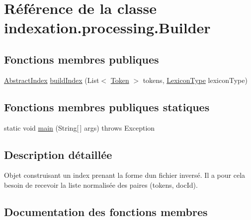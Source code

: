 \hypertarget{classindexation_1_1processing_1_1Builder}{}\section{Référence de la classe indexation.\+processing.\+Builder}
\label{classindexation_1_1processing_1_1Builder}
\subsection*{Fonctions membres publiques}
\begin{DoxyCompactItemize}
\item 
\hyperlink{classindexation_1_1AbstractIndex}{Abstract\+Index} \hyperlink{classindexation_1_1processing_1_1Builder_a648fa541c32720d969073f6aa69ca00d}{build\+Index} (List$<$ \hyperlink{classindexation_1_1content_1_1Token}{Token} $>$ tokens, \hyperlink{enumindexation_1_1AbstractIndex_1_1LexiconType}{Lexicon\+Type} lexicon\+Type)
\end{DoxyCompactItemize}
\subsection*{Fonctions membres publiques statiques}
\begin{DoxyCompactItemize}
\item 
static void \hyperlink{classindexation_1_1processing_1_1Builder_aa3f4d7aac345020e466b405676fdfcb9}{main} (String\mbox{[}$\,$\mbox{]} args)  throws Exception  	
\end{DoxyCompactItemize}


\subsection{Description détaillée}
Objet construisant un index prenant la forme d\textquotesingle{}un fichier inversé. Il a pour cela besoin de recevoir la liste normalisée des paires (tokens, doc\+Id). 

\subsection{Documentation des fonctions membres}
\mbox{\label{classindexation_1_1processing_1_1Builder_a648fa541c32720d969073f6aa69ca00d}} 
